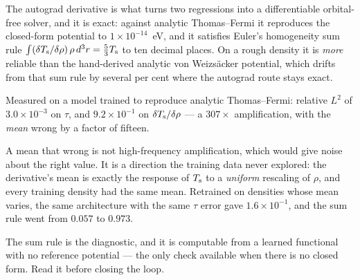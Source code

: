 The autograd derivative is what turns two regressions into a differentiable
orbital-free solver, and it is exact: against analytic Thomas--Fermi it
reproduces the closed-form potential to $1\times10^{-14}$~eV, and it satisfies
Euler's homogeneity sum rule
$\int (\delta T_{\mathrm{s}}/\delta\rho)\,\rho\,d^3r = \tfrac53 T_{\mathrm{s}}$ to ten decimal places.
On a rough density it is \emph{more} reliable than the hand-derived analytic
von Weizs\"acker potential, which drifts from that sum rule by several per cent
where the autograd route stays exact.

\begin{pwarn}[title={Accuracy in $\tau$ does not imply accuracy in its derivative}]
Measured on a model trained to reproduce analytic Thomas--Fermi: relative
$L^2$ of $3.0\times10^{-3}$ on $\tau$, and $9.2\times10^{-1}$ on
$\delta T_{\mathrm{s}}/\delta\rho$ --- a $307\times$ amplification, with the \emph{mean}
wrong by a factor of fifteen.

A mean that wrong is not high-frequency amplification, which would give noise
about the right value. It is a direction the training data never explored: the
derivative's mean is exactly the response of $T_{\mathrm{s}}$ to a \emph{uniform}
rescaling of $\rho$, and every training density had the same mean. Retrained on
densities whose mean varies, the same architecture with the same $\tau$ error
gave $1.6\times10^{-1}$, and the sum rule went from $0.057$ to $0.973$.

The sum rule is the diagnostic, and it is computable from a learned functional
with no reference potential --- the only check available when there is no
closed form. Read it before closing the loop.
\end{pwarn}

